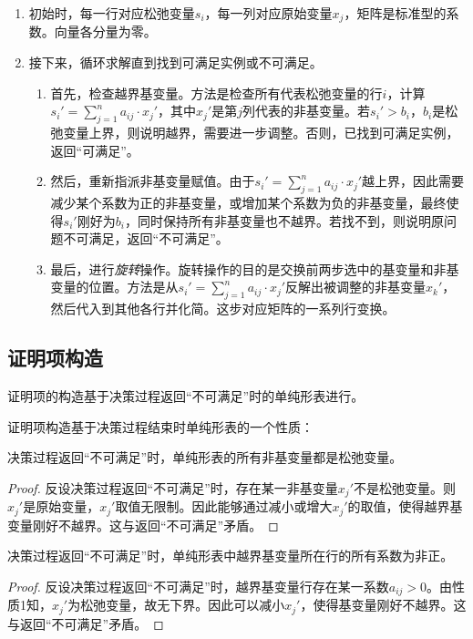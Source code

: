 \begin{enumerate}
  \item 初始时，每一行对应松弛变量$s_i$，每一列对应原始变量$x_j$，矩阵是标准型的系数。向量各分量为零。
  \item 接下来，循环求解直到找到可满足实例或不可满足。
    \begin{enumerate}
      \item 首先，检查越界基变量。方法是检查所有代表松弛变量的行$i$，计算$s_i' = \sum_{j=1}^{n} a_{ij} \cdot x_j'$，其中$x_j'$是第$j$列代表的非基变量。若$s_i' > b_i$，$b_i$是松弛变量上界，则说明越界，需要进一步调整。否则，已找到可满足实例，返回``可满足''。
      \item 然后，重新指派非基变量赋值。由于$s_i' = \sum_{j=1}^{n} a_{ij} \cdot x_j'$越上界，因此需要减少某个系数为正的非基变量，或增加某个系数为负的非基变量，最终使得$s_i'$刚好为$b_i$，同时保持所有非基变量也不越界。若找不到，则说明原问题不可满足，返回``不可满足''。
      \item 最后，进行\emph{旋转}操作。旋转操作的目的是交换前两步选中的基变量和非基变量的位置。方法是从$s_i' = \sum_{j=1}^{n} a_{ij} \cdot x_j'$反解出被调整的非基变量$x_k'$，然后代入到其他各行并化简。这步对应矩阵的一系列行变换。
    \end{enumerate}
\end{enumerate}

\subsection{证明项构造}
证明项的构造基于决策过程返回``不可满足''时的单纯形表进行。

证明项构造基于决策过程结束时单纯形表的一个性质：
\begin{theorem}[性质1]
  决策过程返回``不可满足''时，单纯形表的所有非基变量都是松弛变量。
\end{theorem}
\begin{proof}
反设决策过程返回``不可满足''时，存在某一非基变量$x_j'$不是松弛变量。则$x_j'$是原始变量，$x_j'$取值无限制。因此能够通过减小或增大$x_j'$的取值，使得越界基变量刚好不越界。这与返回``不可满足''矛盾。
\end{proof}

\begin{theorem}[性质2]
  决策过程返回``不可满足''时，单纯形表中越界基变量所在行的所有系数为非正。
\end{theorem}
\begin{proof}
反设决策过程返回``不可满足''时，越界基变量行存在某一系数$a_{ij} > 0$。由性质1知，$x_j'$为松弛变量，故无下界。因此可以减小$x_j'$，使得基变量刚好不越界。这与返回``不可满足''矛盾。
\end{proof}

